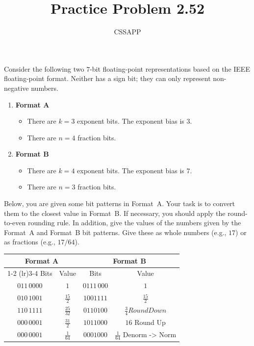 \documentclass{article}
\title{Practice Problem 2.52}
\author{CSSAPP}
\begin{document}
\maketitle

Consider the following two $7$-bit floating-point representations
based on the IEEE floating-point format.
Neither has a sign bit; they can only represent non-negative numbers.

\begin{enumerate}
  \item \textbf{Format A}
  \begin{itemize}
    \item There are $k = 3$ exponent bits. The exponent bias is $3$.
    \item There are $n = 4$ fraction bits.
  \end{itemize}

  \item \textbf{Format B}
  \begin{itemize}
    \item There are $k = 4$ exponent bits. The exponent bias is $7$.
    \item There are $n = 3$ fraction bits.
  \end{itemize}
\end{enumerate}

Below, you are given some bit patterns in Format~A.
Your task is to convert them to the closest value in Format~B.
If necessary, you should apply the round-to-even rounding rule.
In addition, give the values of the numbers given by the Format~A and Format~B bit patterns.
Give these as whole numbers (e.g., $17$) or as fractions (e.g., $17/64$).

\vspace{1em}

\begin{center}
\renewcommand{\arraystretch}{1.4}
\begin{tabular}{cccc}
\toprule
\multicolumn{2}{c}{\textbf{Format A}} & \multicolumn{2}{c}{\textbf{Format B}} \\
\cmidrule(lr){1-2} \cmidrule(lr){3-4}
Bits & Value & Bits & Value \\
\midrule
    $011\,0000$ & $1$ & $0111\,000$ & $1$ \\
    $010\,1001$ & $\frac{15}{2}$ & $1001 111$ & $\frac{15}{2}$ \\
    $110\,1111$ & $\frac{25}{32}$ & $0110 100$  & $\frac{3}{4} Round Down$\\
    $000\,0001$ & $\frac{31}{2}$ & $1011 000$  & $16$ \quad Round Up\\
    $000\,0001$ & $\frac{1}{64}$ & $0001 000$  & $\frac{1}{64}$ Denorm -> Norm\\
\bottomrule
\end{tabular}
\end{center}
\end{document}
